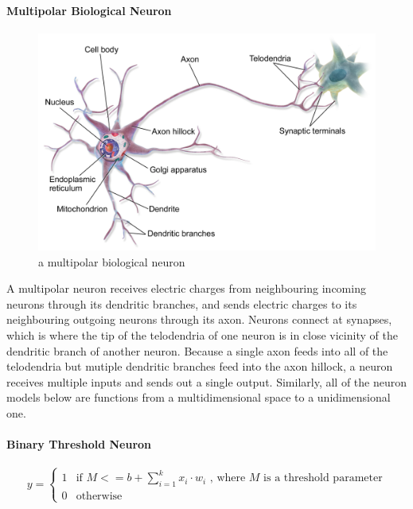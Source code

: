 \documentclass[a4paper,11pt]{article}
\begin{document}
\paragraph{Multipolar Biological Neuron}

\begin{figure}[h!]
	\centering
	\includegraphics[scale=0.3]{images/Biological_Neuron.png}
	\caption{a multipolar biological neuron}
    \label{f8}
\end{figure}

A multipolar neuron receives electric charges from neighbouring incoming neurons through its dendritic branches, and sends electric charges to its neighbouring outgoing neurons through its axon. Neurons connect at synapses, which is where the tip of the telodendria of one neuron is in close vicinity of the dendritic branch of another neuron. Because a single axon feeds into all of the telodendria but mutiple dendritic branches feed into the axon hillock, a neuron receives multiple inputs and sends out a single output. Similarly, all of the neuron models below are functions from a multidimensional space to a unidimensional one.\\

\paragraph{Binary Threshold Neuron}
\begin{equation}
y = \begin{cases} 1 & \mbox{if } M <= b + \sum\limits_{i=1}^k x_{i}\cdot w_{i}  \text{ , where } M \text{ is a threshold parameter} \\ 
				  0 & \mbox{otherwise} \end{cases}
\end{equation} \\
\end{document}
